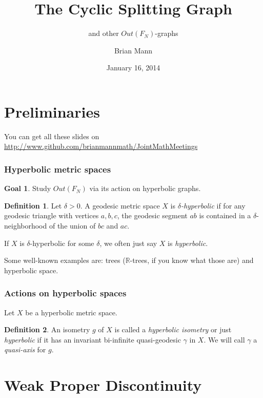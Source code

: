 \documentclass{beamer}
\title{The Cyclic Splitting Graph}
\subtitle{and other $Out(F_N)$-graphs}
\author{Brian Mann}
\institute{University of Utah}
\date{January 16, 2014}
\theoremstyle{theorem}
\theoremstyle{definition}
\newtheorem*{defin}{Definition}
\newtheorem*{goal}{Goal}
\newcommand{\R}{\ensuremath{\mathbb R}}
\renewcommand{\-}{\ensuremath{^{-1}}}
\renewcommand{\>}{\ensuremath{\rightarrow}}
\renewcommand{\(}{\langle}
\renewcommand{\)}{\rangle}
\begin{document}
\begin{frame}
\titlepage
\end{frame}



\section{Preliminaries}

\begin{frame}
You can get all these slides on \url{http://www.github.com/brianmannmath/JointMathMeetings}
\end{frame}


\begin{frame}
\frametitle{Hyperbolic metric spaces}
\begin{goal}
Study $Out(F_N)$ via its action on hyperbolic graphs.
\end{goal}
\pause
\begin{defin}
Let $\delta > 0$. A geodesic metric space $X$ is \emph{$\delta$-hyperbolic} if for any geodesic triangle with vertices $a,b,c$, the geodesic segment $ab$ is contained in a $\delta$-neighborhood of the union of $bc$ and $ac$.

If $X$ is $\delta$-hyperbolic for some $\delta$, we often just say $X$ is \emph{hyperbolic}. 
\end{defin}

\pause

Some well-known examples are: trees ($\R$-trees, if you know what those are) and hyperbolic space.
\end{frame}

\begin{frame}
\frametitle{Actions on hyperbolic spaces}
Let $X$ be a hyperbolic metric space.
\pause
\begin{defin}
An isometry $g$ of $X$ is called a \emph{hyperbolic isometry} or just \emph{hyperbolic} if it has an invariant bi-infinite quasi-geodesic $\gamma$ in $X$. We will call $\gamma$ a \emph{quasi-axis} for $g$.
\end{defin}
\end{frame}

\section{Weak Proper Discontinuity}
\end{document}
